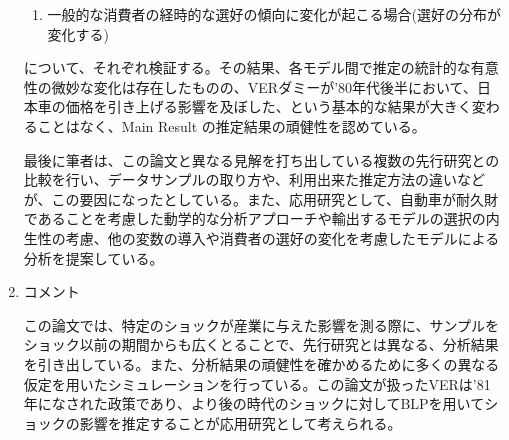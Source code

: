\documentclass{jsarticle}
\begin{document}
\begin{enumerate}
\begin{enumerate}
 \item 一般的な消費者の経時的な選好の傾向に変化が起こる場合(選好の分布が変化する)
 
 \end{enumerate}

について、それぞれ検証する。その結果、各モデル間で推定の統計的な有意性の微妙な変化は存在したものの、VERダミーが'80年代後半において、日本車の価格を引き上げる影響を及ぼした、という基本的な結果が大きく変わることはなく、Main Result の推定結果の頑健性を認めている。

最後に筆者は、この論文と異なる見解を打ち出している複数の先行研究との比較を行い、データサンプルの取り方や、利用出来た推定方法の違いなどが、この要因になったとしている。また、応用研究として、自動車が耐久財であることを考慮した動学的な分析アプローチや輸出するモデルの選択の内生性の考慮、他の変数の導入や消費者の選好の変化を考慮したモデルによる分析を提案している。

\item コメント

この論文では、特定のショックが産業に与えた影響を測る際に、サンプルをショック以前の期間からも広くとることで、先行研究とは異なる、分析結果を引き出している。また、分析結果の頑健性を確かめるために多くの異なる仮定を用いたシミュレーションを行っている。この論文が扱ったVERは'81年になされた政策であり、より後の時代のショックに対してBLPを用いてショックの影響を推定することが応用研究として考えられる。

\end{enumerate}
\end{document}
